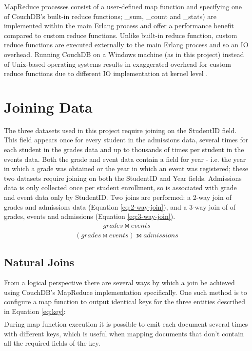 MapReduce processes consist of a user-defined map function and specifying one of CouchDB's built-in reduce functions; \_sum, \_count and \_stats) are implemented within the main Erlang process and offer a performance benefit compared to custom reduce functions. Unlike built-in reduce function, custom reduce functions are executed externally to the main Erlang process and so an IO overhead. Running CouchDB on a Windows machine (as in this project) instead of Unix-based operating systems results in exaggerated overhead for custom reduce functions due to different IO implementation at kernel level \cite{slack1Nov}.

\section{Joining Data}
The three datasets used in this project require joining on the StudentID field. This field appears once for every student in the admissions data, several times for each student in the grades data and up to thousands of times per student in the events data. Both the grade and event data contain a field for year - i.e. the year in which a grade was obtained or the year in which an event was registered; these two datasets require joining on both the StudentID and Year fields. Admissions data is only collected once per student enrollment, so is associated with grade and event data only by StudentID. Two joins are performed: a 2-way join of grades and admissions data (Equation \ref{eq:2-way-join}), and a 3-way join of of grades, events and admissions (Equation \ref{eq:3-way-join}).
\begin{align}
  grades \bowtie events\label{eq:2-way-join}
\end{align}
\begin{align}
  (grades \bowtie events) \leftouterjoin admissions\label{eq:3-way-join}
\end{align}

\subsection{Natural Joins}
From a logical perspective there are several ways by which a join be achieved using CouchDB's MapReduce implementation specifically. One such method is to configure a map function to output identical keys for the three entities described in Equation \ref{eq:key}:
\begin{align}
  [studentNumber,courseCode,year]\label{eq:key}
\end{align}
During map function execution it is possible to emit each document several times with different keys, which is useful when mapping documents that don't contain all the required fields of the key.

